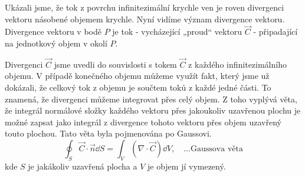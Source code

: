       Ukázali jsme, že tok z povrchu infinitezimální krychle ven je roven divergenci vektoru
      násobené objemem krychle. Nyní vidíme význam divergence vektoru. Divergence vektoru v bodě
      \(P\) je tok - vycházející „proud“ vektoru $\vec{C}$ - připadající na jednotkový objem v okolí
      \(P\).
      
      Divergenci \(\vec{C}\) jsme uvedli do souvislosti s tokem \(\vec{C}\) z každého
      infinitezimálního objemu. V případě konečného objemu můžeme využít fakt, který jsme už
      dokázali, že celkový tok z objemu je součtem toků z každé jedné části. To znamená, že
      divergenci můžeme integrovat přes celý objem. Z toho vyplývá věta, že integrál normálové
      složky každého vektoru přes jakoukoliv uzavřenou plochu je možné zapsat jako integrál z
      divergence tohoto vektoru přes objem uzavřený touto plochou. Tato věta byla pojmenována po
      Gaussovi.
      \begin{equation}\label{fyz:eq_gauss_veta}
        \oint_S \vec{C}\cdot\vec{n}\dd{S} 
          = \int_V (\nabla\cdot\vec{C})\dd{V}, \quad\ldots\text{Gaussova věta}
      \end{equation}
      kde $S$ je jakákoliv uzavřená plocha a $V$ je objem jí vymezený.
      
